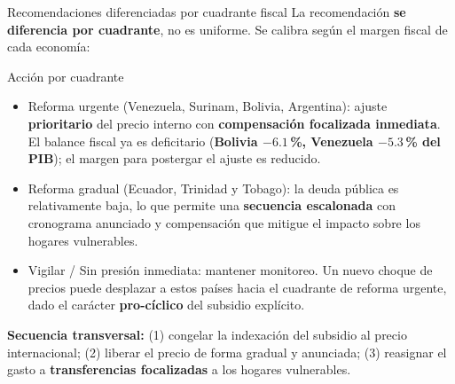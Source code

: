\documentclass[aspectratio=169,10pt]{beamer}
\newcommand{\key}[1]{{\bfseries\color{AcentoRojo}#1}}
\begin{document}
\begin{frame}{Recomendaciones diferenciadas por cuadrante fiscal}
  \small
  La recomendación \textbf{se diferencia por cuadrante}, no es uniforme. Se calibra según
  el margen fiscal de cada economía:
  \begin{block}{Acción por cuadrante}
    \footnotesize
    \begin{itemize}
      \item \alert{Reforma urgente} (Venezuela, Surinam, Bolivia, Argentina): ajuste
            \textbf{prioritario} del precio interno con \textbf{compensación focalizada inmediata}.
            El balance fiscal ya es deficitario (\key{Bolivia $-6.1$\,\%, Venezuela $-5.3$\,\%
            del PIB}); el margen para postergar el ajuste es reducido.
      \item \alert{Reforma gradual} (Ecuador, Trinidad y Tobago): la deuda pública es
            relativamente baja, lo que permite una \textbf{secuencia escalonada} con cronograma
            anunciado y compensación que mitigue el impacto sobre los hogares vulnerables.
      \item \alert{Vigilar / Sin presión inmediata:} mantener monitoreo. Un nuevo choque de
            precios puede desplazar a estos países hacia el cuadrante de reforma urgente,
            dado el carácter \textbf{pro-cíclico} del subsidio explícito.
    \end{itemize}
  \end{block}
  \vspace{-0.2em}
  {\footnotesize \textbf{Secuencia transversal:} (1) congelar la indexación del subsidio al precio
  internacional; (2) liberar el precio de forma gradual y anunciada; (3) reasignar el gasto a
  \textbf{transferencias focalizadas} a los hogares vulnerables.}

\end{frame}
\end{document}
